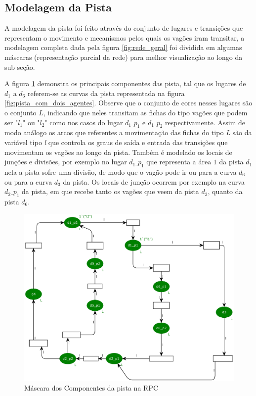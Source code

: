\subsection{Modelagem da Pista}
\label{sub:model_pista}
A modelagem da pista foi feito através do conjunto de lugares e transições que representam o movimento e mecanismos pelos quais os vagões iram transitar, a modelagem completa dada pela figura \ref{fig:rede_geral} foi dividida em algumas máscaras (representação parcial da rede) para melhor visualização ao longo da sub seção. 

A figura \ref{fig:pista_RPC} demonstra os principais componentes das pista, tal que os lugares de $d_1$ a $d_6$ referem-se as curvas da pista representada na figura \ref{fig:pista_com_dois_agentes}. Observe que o conjunto de cores nesses lugares são o conjunto $L$, indicando que neles transitam as fichas do tipo vagões que podem ser "$l_1$" ou "$l_2$" como nos casos do lugar $d_1\_p_1$ e $d_1\_p_2$ respectivamente. Assim de modo análogo os arcos que referentes a movimentação das fichas do tipo \textit{L} são da variável tipo \textit{l} que controla os graus de saída e entrada das transições que movimentam os vagões ao longo da pista. Também é modelado os locais de junções e divisões, por exemplo no lugar $d_1\_p_1$ que representa a área $1$ da pista $d_1$ nela a pista sofre uma divisão, de modo que o vagão pode ir ou para a curva $d_6$ ou para a curva $d_3$ da pista. Os locais de junção ocorrem por exemplo na curva $d_2\_p_1$ da pista, em que recebe tanto os vagões que veem da pista $d_3$, quanto da pista $d_6$.
\begin{figure}[ht]
    \centering
    \caption{Máscara dos Componentes da pista na RPC}
    \label{fig:pista_RPC}
    \includegraphics[width=1\linewidth]{figures//Simulation//Modelagem/pista.eps}
\end{figure}

